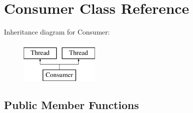 \hypertarget{class_consumer}{
\section{\-Consumer \-Class \-Reference}
\label{class_consumer}
}
\-Inheritance diagram for \-Consumer\-:\begin{figure}[H]
\begin{center}
\leavevmode
\includegraphics[height=2.000000cm]{class_consumer}
\end{center}
\end{figure}
\subsection*{\-Public \-Member \-Functions}

